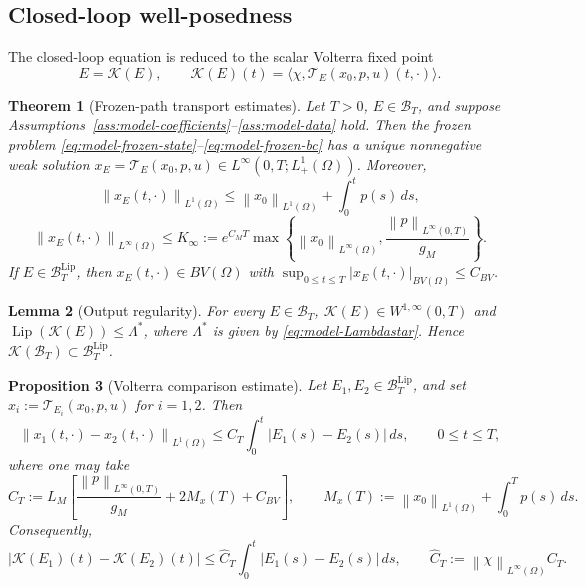 \documentclass[pdflatex,sn-mathphys-num]{sn-jnl}
\theoremstyle{thmstyleone}
\newtheorem{theorem}{Theorem}[section]
\newtheorem{proposition}[theorem]{Proposition}
\newtheorem{lemma}[theorem]{Lemma}
\theoremstyle{definition}
\theoremstyle{remark}
\newcommand{\Om}{\Omega}
\newcommand{\Tcal}{\mathcal{T}}
\newcommand{\Kcal}{\mathcal{K}}
\newcommand{\Bt}{\mathcal{B}_T}
\newcommand{\Btl}{\mathcal{B}_T^{\mathrm{Lip}}}
\newcommand{\Lip}{\operatorname{Lip}}
\newcommand{\norm}[1]{\left\lVert#1\right\rVert}
\newcommand{\abs}[1]{\left\lvert#1\right\rvert}
\numberwithin{equation}{section}
\begin{document}
\subsection{Closed-loop well-posedness}
\label{subsec:main-wellposedness}
The closed-loop equation is reduced to the scalar Volterra fixed point
\[
E=\Kcal(E),
\qquad
\Kcal(E)(t)=\langle \chi,\Tcal_E(x_0,p,u)(t,\cdot)\rangle .
\]
\begin{theorem}[Frozen-path transport estimates]
\label{thm:main-frozen}
Let \(T>0\), \(E\in\Bt\), and suppose
Assumptions~\ref{ass:model-coefficients}--\ref{ass:model-data} hold. Then the
frozen problem \eqref{eq:model-frozen-state}--\eqref{eq:model-frozen-bc} has a
unique nonnegative weak solution
$\displaystyle 
x_E=\Tcal_E(x_0,p,u)\in L^\infty(0,T;L^1_+(\Om))$.
Moreover,
\[
\norm{x_E(t,\cdot)}_{L^1(\Om)}
\le
\norm{x_0}_{L^1(\Om)}+\int_0^t p(s)\,ds,
\]
\[
\norm{x_E(t,\cdot)}_{L^\infty(\Om)}
\le
K_\infty
:=
e^{C_M T}
\max\left\{
\norm{x_0}_{L^\infty(\Om)},
\frac{\norm{p}_{L^\infty(0,T)}}{g_M}
\right\}.
\]
If \(E\in\Btl\), then
$\displaystyle 
x_E(t,\cdot)\in BV(\Om)$ with 
$\displaystyle \sup_{0\le t\le T}\abs{x_E(t,\cdot)}_{BV(\Om)}
\le C_{BV}$.
\end{theorem}
\begin{lemma}[Output regularity]
\label{lem:main-output-regularity}
For every \(E\in\Bt\),
$\Kcal(E)\in W^{1,\infty}(0,T)$ and
$\Lip(\Kcal(E))\le \Lambda^*$,
where \(\Lambda^*\) is given by \eqref{eq:model-Lambdastar}. Hence
$\displaystyle \Kcal(\Bt)\subset\Btl$.
\end{lemma}
\begin{proposition}[Volterra comparison estimate]
\label{prop:main-volterra}
Let \(E_1,E_2\in\Btl\), and set
$\displaystyle x_i:=\Tcal_{E_i}(x_0,p,u)$ for $i=1,2$.
Then
\[
\norm{x_1(t,\cdot)-x_2(t,\cdot)}_{L^1(\Om)}
\le
C_T\int_0^t\abs{E_1(s)-E_2(s)}\,ds ,
\qquad
0\le t\le T,
\]
where one may take
\[
C_T
:=
L_M
\left[
\frac{\norm{p}_{L^\infty(0,T)}}{g_M}
+
2M_x(T)
+
C_{BV}
\right],
\qquad
M_x(T):=\norm{x_0}_{L^1(\Om)}+\int_0^T p(s)\,ds .
\]
Consequently,
\[
\abs{\Kcal(E_1)(t)-\Kcal(E_2)(t)}
\le
\widehat C_T
\int_0^t\abs{E_1(s)-E_2(s)}\,ds,
\qquad
\widehat C_T:=\norm{\chi}_{L^\infty(\Om)}C_T .
\]
\end{proposition}
\end{document}
